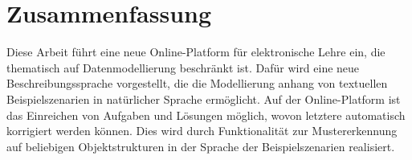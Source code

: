 \chapter*{Zusammenfassung}


Diese Arbeit führt eine neue Online-Platform für elektronische Lehre ein, die thematisch auf Datenmodellierung beschränkt ist.
Dafür wird eine neue Beschreibungssprache vorgestellt, die die Modellierung anhang von textuellen Beispielszenarien in natürlicher Sprache ermöglicht.
Auf der Online-Platform ist das Einreichen von Aufgaben und Lösungen möglich, wovon letztere automatisch korrigiert werden können.
Dies wird durch Funktionalität zur Mustererkennung auf beliebigen Objektstrukturen in der Sprache der Beispielszenarien realisiert.
